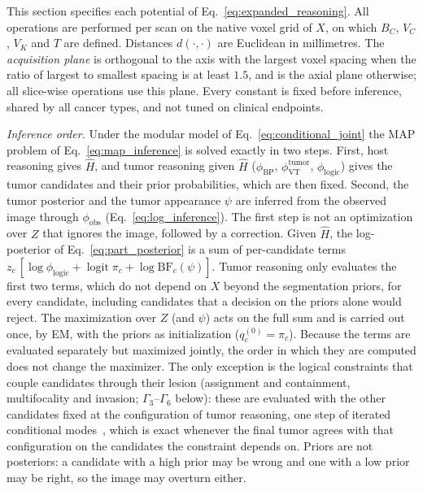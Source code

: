 \documentclass[fleqn,10pt]{olplainarticle}
\begin{document}
This section specifies each potential of Eq.~\eqref{eq:expanded_reasoning}. All operations are performed per scan on the
native voxel grid of $X$, on which $B_C$, $V_C$, $V_K$ and $T$ are defined. Distances $d(\cdot,\cdot)$ are Euclidean in
millimetres. The \emph{acquisition plane} is orthogonal to the axis with the largest voxel spacing when the ratio of
largest to smallest spacing is at least $1.5$, and is the axial plane otherwise; all slice-wise operations use this plane.
Every constant is fixed before inference, shared by all cancer types, and not tuned on clinical endpoints.

\textit{Inference order.} Under the modular model of Eq.~\eqref{eq:conditional_joint} the MAP problem of
Eq.~\eqref{eq:map_inference} is solved exactly in two steps. First, host reasoning gives $\hat H$, and tumor reasoning
given $\hat H$ ($\phi_{\mathrm{BP}}$, $\phi^{\mathrm{tumor}}_{\mathrm{VT}}$, $\phi_{\mathrm{logic}}$) gives the tumor
candidates and their prior probabilities, which are then fixed. Second, the tumor posterior and the tumor appearance $\psi$
are inferred from the observed image through $\phi_{\mathrm{obs}}$ (Eq.~\eqref{eq:log_inference}).
The first step is not an optimization over $Z$ that ignores the image, followed by a correction. Given $\hat H$, the
log-posterior of Eq.~\eqref{eq:part_posterior} is a sum of per-candidate terms
$z_c\,[\log\phi_{\mathrm{logic}}+\operatorname{logit}\pi_c+\log\mathrm{BF}_c(\psi)]$. Tumor reasoning only evaluates the first
two terms, which do not depend on $X$ beyond the segmentation priors, for every candidate, including candidates that a
decision on the priors alone would reject. The maximization over $Z$ (and $\psi$) acts on the full sum and is carried out
once, by EM, with the priors as initialization ($q_c^{(0)}=\pi_c$). Because the terms are evaluated separately but maximized
jointly, the order in which they are computed does not change the maximizer. The only exception is the logical constraints
that couple candidates through their lesion (assignment and containment, multifocality and invasion; $\Gamma_3$--$\Gamma_6$
below): these are evaluated with the other candidates fixed at the configuration of tumor reasoning, one step of iterated
conditional modes~\cite{besag1986statistical}, which is exact whenever the final tumor agrees with that configuration on the
candidates the constraint depends on. Priors are not posteriors: a candidate with a high prior may be wrong and one with a low prior
may be right, so the image may overturn either.
\end{document}
